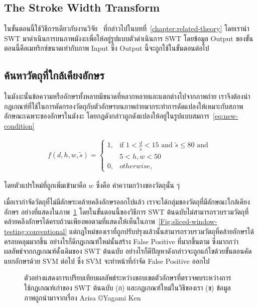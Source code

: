 \subsection{The Stroke Width Transform}
ในขั้นตอนนี้ใช้วิธีการเดียวกับงานวิจัย~\cite{5540041} ที่กล่าวไปในบทที่~\ref{chapter:related-theory} โดยเรานำ SWT มาดำเนินการบนภาพมังงะเพื่อให้อยู่รูปแบบตัวดำเนินการ SWT โดยข้อมูล Output ของขั้นตอนนี้คือเมทริกซ์ขนาดเท่ากับภาพ Input ซึ่ง Output นี้จะถูกใช้ในขั้นตอนต่อไป

\subsection{ค้นหาวัตถุที่ใกล้เคียงอักษร}
ในมังงะนั้นข้อความหรืออักษรทั้งหลายมีขนาดที่หลากหลายและแตกต่างไปจากภาพถ่าย เราจึงต้องนำกฎเกณฑ์ที่ใช้ในการคัดกรองวัตถุกับตัวอักษรบนภาพถ่ายมากระทำการดัดแปลงให้เหมาะกับสภาพลักษณะเฉพาะของอักษรในมังงะ โดยกฎดังกล่าวถูกดังแปลงให้อยู่ในรูปแบบสมการ~\ref{eq:new-condition}

\begin{equation}
    \begin{split}
        f(d, h, w, \tilde{s}) =
        \begin{cases}
            1, &\text{if } 1 < \frac{d}{\tilde{s}} < 15 \text{ and } \tilde{s} \leq 80 \text{ and } \\ & 5 < h, w < 50 \\
            0, &otherwise,
        \end{cases}
    \end{split}
\label{eq:new-condition}
\end{equation}

โดยตัวแปรใหม่ที่ถูกเพิ่มเข้ามาคือ $w$ ซึ่งคือ ค่าความกว้างของวัตถุนั้น ๆ

เมื่อเรากำจัดวัตถุที่ไม่มีลักษระคล้ายคลึงอักษรออกไปแล้ว เราจะได้กลุ่มของวัตถุที่มีลักษณะใกล้เคียงอักษร อย่างที่แสดงในภาพ~\ref{Fig:sliced-window-testing} โดยในขั้นตอนนี้ของวิธีการ SWT ต้นฉบับไม่สามารถรวบรวมวัตถุที่คล้ายคลึงอักษรได้ครบถ้วนเพียงพอตามที่แสดงให้เห็นในภาพ~\ref{Fig:sliced-window-testing:conventional} แต่กฎใหม่ของเราที่ถูกปรับปรุงแล้วนั้นสามารถรวบรวมวัตถุที่คล้ายอักษรได้ครอบคลุมมากขึ้น อย่างไรก็ดีกฎเกณฑ์ใหม่นั้นสร้าง False Positive ที่มากขึ้นตาม ซึ่งมากกว่าผลลัพธ์จากกฏเกณฑ์ดั้งเดิมของ SWT ต้นฉบับ อย่างไรก็ดีปัญหาดังกล่าวจะถูกแก้ไขด้วยขั้นตอนคัดแยกอักษรด้วย SVM ต่อไป ซึ่ง SVM จะทำหน้าที่กำจัด False Positive ออกไป

\begin{figure}[!t]
    \centering
    \caption{ตัวอย่างแสดงการเปรียบเทียบผลลัพธ์ระหว่างขอบเขตตัวอักษรที่ตรวจพบระหว่างการใช้กฏเกณฑ์เก่าของ SWT ต้นฉบับ (ก) และกฏเกณฑ์ใหม่ในวิธีของเรา (ข) ข้อมูลภาพถูกนำมาจากเรื่อง Arisa \copyright Yagami Ken}
    \label{Fig:sliced-window-testing}
\end{figure}

